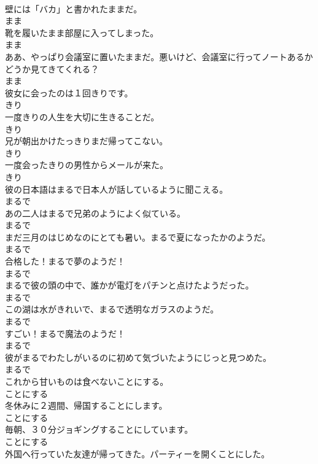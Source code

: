 \documentclass[8pt]{extreport}
\begin{document}
\begin{CJK}{UTF8}{min}
\\	壁には「バカ」と書かれたままだ。	
\\	まま
\\	靴を履いたまま部屋に入ってしまった。	
\\	まま
\\	ああ、やっぱり会議室に置いたままだ。悪いけど、会議室に行ってノートあるかどうか見てきてくれる？	
\\	まま
\\	彼女に会ったのは１回きりです。	
\\	きり
\\	一度きりの人生を大切に生きることだ。	
\\	きり
\\	兄が朝出かけたっきりまだ帰ってこない。	
\\	きり
\\	一度会ったきりの男性からメールが来た。	
\\	きり
\\	彼の日本語はまるで日本人が話しているように聞こえる。	
\\	まるで
\\	あの二人はまるで兄弟のようによく似ている。	
\\	まるで
\\	まだ三月のはじめなのにとても暑い。まるで夏になったかのようだ。	
\\	まるで
\\	合格した！まるで夢のようだ！	
\\	まるで
\\	まるで彼の頭の中で、誰かが電灯をパチンと点けたようだった。	
\\	まるで
\\	この湖は水がきれいで、まるで透明なガラスのようだ。	
\\	まるで
\\	すごい！まるで魔法のようだ！	
\\	まるで
\\	彼がまるでわたしがいるのに初めて気づいたようにじっと見つめた。	
\\	まるで
\\	これから甘いものは食べないことにする。	
\\	ことにする
\\	冬休みに２週間、帰国することにします。	
\\	ことにする
\\	毎朝、３０分ジョギングすることにしています。	
\\	ことにする
\\	外国へ行っていた友達が帰ってきた。パーティーを開くことにした。	

\end{CJK}
\end{document}
